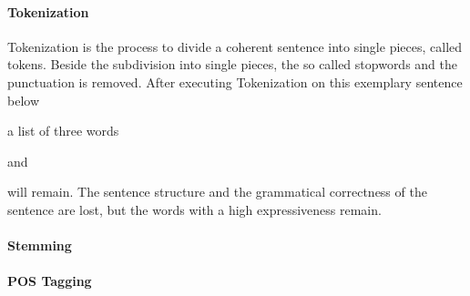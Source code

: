 \paragraph{Tokenization}
Tokenization is the process to divide a coherent sentence into single pieces, called tokens.
Beside the subdivision into single pieces, the so called stopwords and the punctuation is removed.
After executing Tokenization on this exemplary sentence below
\begin{center}
\end{center}
a list of three words
\begin{center}
    and 
\end{center}
will remain.\newline
The sentence structure and the grammatical correctness of the sentence are lost, but the words with a high expressiveness remain.
\paragraph{Stemming}
\paragraph{\acs{POS} Tagging}
